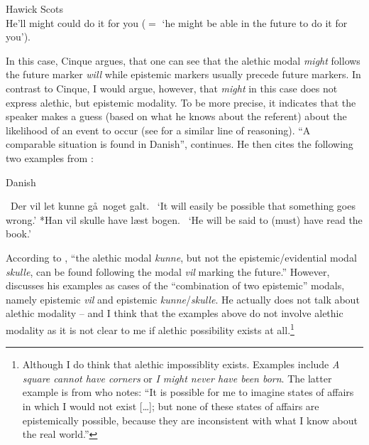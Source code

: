 \begin{exe}
\ex\label{bsp:multimodalenglish} 
Hawick Scots \citep[75]{brown1922double}  \\He'll might could do it for you ($=$ `he might be able in the future to do it for you').
\end{exe}

\noindent In this case, Cinque argues, that one can see that the alethic modal \textit{might} follows the future marker \textit{will} while epistemic markers usually precede future markers. In contrast to Cinque, I would argue, however, that \textit{might} in this case does not express alethic, but epistemic modality. To be more precise, it indicates that the speaker makes a guess (based on what he knows about the referent) about the likelihood of an event to occur (see \citealt[6]{bour2014description} for a similar line of reasoning).  ``A comparable situation is found in Danish'', \citet[79]{cinque1999adverbs} continues. He then cites the following two examples from \citet[10]{vikner1988modality}:

\begin{exe} 
\ex Danish \citep[10]{vikner1988modality}\begin{xlist} 
\ex \label{bsp:vikner1988a} 
\textcolor{white}{*}Der vil let kunne g\aa\ noget galt.%
\trans \textcolor{white}{*}`It will easily be possible that something goes wrong.'
\ex\label{bsp:vikner1988b}
*Han vil skulle have l\ae st bogen.
\trans \textcolor{white}{*}`He will be said to (must) have read the book.'
\end{xlist} 
\end{exe}

\noindent According to \citet[79]{cinque1999adverbs}, ``the alethic modal \textit{kunne}, but not the epistemic/evidential modal \textit{skulle}, can be found following the modal \textit{vil} marking the future.'' However, \citet[10]{vikner1988modality} discusses his examples as cases of the ``combination of two epistemic'' modals, namely epistemic \textit{vil} and epistemic \textit{kunne}/\textit{skulle}. He actually does not talk about alethic modality -- and I think that the examples above do not involve alethic modality as it is not clear to me if alethic possibility exists at all.\footnote{ Although I do think that alethic impossiblity exists. Examples include \textit{A square cannot have corners} or \textit{I might never have been born}. The latter example is from \citep[16]{kroeger2018} who notes: ``It is possible for me to imagine states of affairs in which I would not exist [\dots ]; but none of these states of affairs are epistemically possible, because they are inconsistent with what I know about the real world.''}

